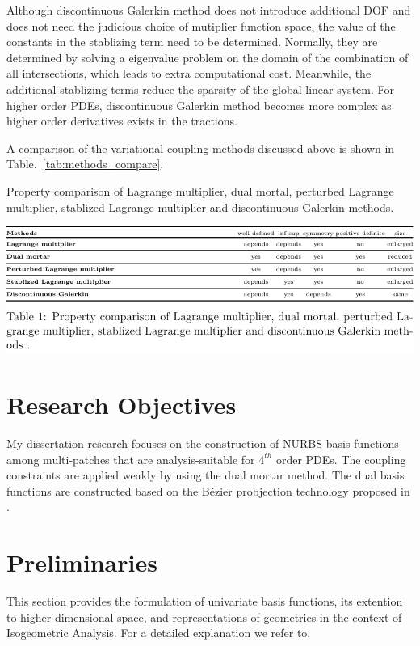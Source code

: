 \documentclass[preprint,12pt]{elsarticle}
\newcommand{\Bezier}{{B\'{e}zier} }
\begin{document}
Although discontinuous Galerkin method does not introduce additional DOF and does not need the judicious choice of mutiplier function space, the value of the constants in the stablizing term need to be determined. Normally, they are determined by solving a eigenvalue problem on the domain of the combination of all intersections, which leads to extra computational cost. Meanwhile, the additional stablizing terms reduce the sparsity of the global linear system. For higher order PDEs, discontinuous Galerkin method becomes more complex as higher order derivatives exists in the tractions.\par
A comparison of the variational coupling methods discussed above is shown in Table.~\ref{tab:methods_compare}.
\begin{table}
    \caption{Property comparison of Lagrange multiplier, dual mortal, perturbed Lagrange multiplier, stablized Lagrange multiplier and discontinuous Galerkin methods.}
	\centering
    \includegraphics[width=\linewidth]{methods_compare}\label{tab:methods_compare}
\end{table}
\section{Research Objectives}
My dissertation research focuses on the construction of NURBS basis functions among multi-patches that are analysis-suitable for $4^{th}$ order PDEs. The coupling constraints are applied weakly by using the dual mortar method. The dual basis functions are constructed based on the \Bezier probjection technology proposed in \cite{thomas2015bezier}. 
\section{Preliminaries}
This section provides the formulation of univariate basis functions, its extention to higher dimensional space, and representations of geometries in the context of Isogeometric Analysis. For a detailed explanation we refer to.
\end{document}
